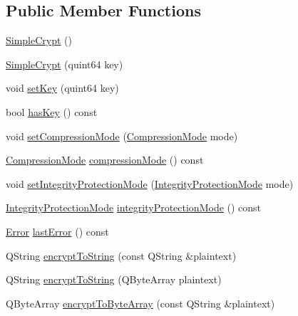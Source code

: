 \subsection*{Public Member Functions}
\begin{DoxyCompactItemize}
\item 
\mbox{\hyperlink{class_simple_crypt_ac474d12cfa9f93bfecea35891831046d}{Simple\+Crypt}} ()
\item 
\mbox{\hyperlink{class_simple_crypt_a65942757b85b3dd36618ea3edc5ceb89}{Simple\+Crypt}} (quint64 key)
\item 
void \mbox{\hyperlink{class_simple_crypt_aa7aad9ed2e88b883ba9214c7d9928745}{set\+Key}} (quint64 key)
\item 
bool \mbox{\hyperlink{class_simple_crypt_ad800808bcffc9a09225c651200b3ef5c}{has\+Key}} () const
\item 
void \mbox{\hyperlink{class_simple_crypt_adc6c6355aa276c0d3516f7ad273f063b}{set\+Compression\+Mode}} (\mbox{\hyperlink{class_simple_crypt_a25298e746f175cf175a18f082092ca8e}{Compression\+Mode}} mode)
\item 
\mbox{\hyperlink{class_simple_crypt_a25298e746f175cf175a18f082092ca8e}{Compression\+Mode}} \mbox{\hyperlink{class_simple_crypt_ac0a68b3ef5441aaf7724f11376e036bd}{compression\+Mode}} () const
\item 
void \mbox{\hyperlink{class_simple_crypt_a4fef5e6d3246ee57d6a7b68475b12b8b}{set\+Integrity\+Protection\+Mode}} (\mbox{\hyperlink{class_simple_crypt_a42a5172e558d346b28421cc4e85feb2d}{Integrity\+Protection\+Mode}} mode)
\item 
\mbox{\hyperlink{class_simple_crypt_a42a5172e558d346b28421cc4e85feb2d}{Integrity\+Protection\+Mode}} \mbox{\hyperlink{class_simple_crypt_ac8940489ec63b0022335d9d6ab3b11a1}{integrity\+Protection\+Mode}} () const
\item 
\mbox{\hyperlink{class_simple_crypt_ab7f81049e78f021b55a36f7cfac5a09b}{Error}} \mbox{\hyperlink{class_simple_crypt_acb412b13386bf2bcb31552bc40949b39}{last\+Error}} () const
\item 
Q\+String \mbox{\hyperlink{class_simple_crypt_af26a3d3c6cef9732190c1d2c6a53a5b5}{encrypt\+To\+String}} (const Q\+String \&plaintext)
\item 
Q\+String \mbox{\hyperlink{class_simple_crypt_aa72b79bf7a5bb971bf3b0a52b9247efd}{encrypt\+To\+String}} (Q\+Byte\+Array plaintext)
\item 
Q\+Byte\+Array \mbox{\hyperlink{class_simple_crypt_ae1991c7748b2bb74468bee0be372d2c4}{encrypt\+To\+Byte\+Array}} (const Q\+String \&plaintext)

\end{DoxyCompactItemize}
